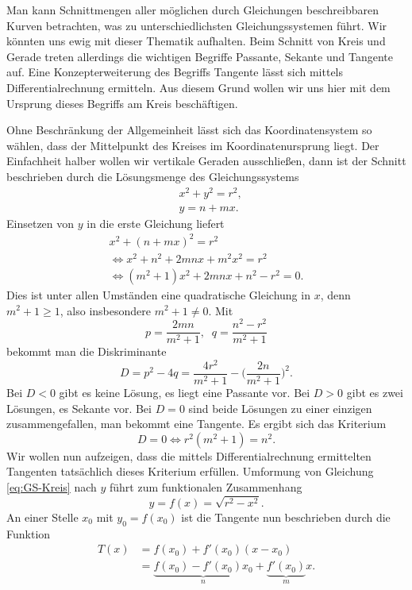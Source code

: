 Man kann Schnittmengen aller möglichen durch Gleichungen
beschreibbaren Kurven betrachten, was zu unterschiedlichsten
Gleichungssystemen führt. Wir könnten uns ewig mit dieser
Thematik aufhalten. Beim Schnitt von Kreis und Gerade treten
allerdings die wichtigen Begriffe Passante, Sekante und Tangente
auf. Eine Konzepterweiterung des Begriffs Tangente lässt sich
mittels Differentialrechnung ermitteln. Aus diesem Grund wollen wir
uns hier mit dem Ursprung dieses Begriffs am Kreis beschäftigen.

Ohne Beschränkung der Allgemeinheit lässt sich das Koordinatensystem
so wählen, dass der Mittelpunkt des Kreises im Koordinatenursprung
liegt. Der Einfachheit halber wollen wir vertikale Geraden
ausschließen, dann ist der Schnitt beschrieben durch die Lösungsmenge
des Gleichungssystems%
\begin{align}\label{eq:GS-Kreis}
& x^2 + y^2 = r^2,\\
& y = n+mx.
\end{align}
Einsetzen von $y$ in die erste Gleichung liefert%
\begin{gather*}
x^2+(n+mx)^2 = r^2\\
\iff x^2+n^2+2mnx+m^2 x^2 = r^2\\
\iff (m^2+1)x^2 + 2mnx + n^2-r^2 = 0.
\end{gather*}
Dies ist unter allen Umständen eine quadratische Gleichung in $x$,
denn $m^2+1\ge 1$, also insbesondere $m^2+1\ne 0$. Mit%
\[p = \frac{2mn}{m^2+1},\;\; q = \frac{n^2-r^2}{m^2+1}\]
bekommt man die Diskriminante
\[D = p^2-4q = \frac{4r^2}{m^2+1}-\Big(\frac{2n}{m^2+1}\Big)^2.\]
Bei $D<0$ gibt es keine Lösung, es liegt eine Passante vor. Bei
$D>0$ gibt es zwei Lösungen, es Sekante vor. Bei $D=0$ sind beide
Lösungen zu einer einzigen zusammengefallen, man bekommt eine
Tangente. Es ergibt sich das Kriterium%
\begin{equation}\label{eq:Tangentenkriterium}
D=0\iff r^2(m^2+1)=n^2.
\end{equation}
Wir wollen nun aufzeigen, dass die mittels Differentialrechnung
ermittelten Tangenten tatsächlich dieses Kriterium erfüllen.
Umformung von Gleichung \eqref{eq:GS-Kreis} nach $y$ führt zum
funktionalen Zusammenhang%
\begin{equation}
y = f(x) = \sqrt{r^2-x^2}.
\end{equation}
An einer Stelle $x_0$ mit $y_0=f(x_0)$ ist die Tangente nun
beschrieben durch die Funktion%
\begin{align}
T(x) &= f(x_0)+f'(x_0)(x-x_0)\\
&= \underbrace{f(x_0)-f'(x_0)x_0}_{n}+\underbrace{f'(x_0)}_{m}x.
\end{align}
